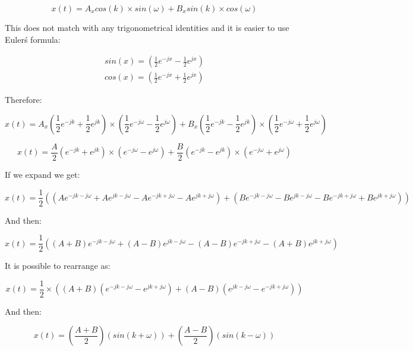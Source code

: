 \begin{equation}
x(t)=A_x cos(k)\times sin(\omega)+ B_x sin(k)\times cos(\omega)
\end{equation}

This does not match with any trigonometrical identities and it is easier to use Euler\'s formula:

\begin{eqnarray}
sin(x)=(\frac{1}{2}e^{-jx} - \frac{1}{2}e^{jx})\\
cos(x)=(\frac{1}{2}e^{-jx} + \frac{1}{2}e^{jx})
\end{eqnarray}

Therefore:

\begin{equation}
x(t)=A_x (\frac{1}{2}e^{-jk} + \frac{1}{2}e^{jk})\times (\frac{1}{2}e^{-j\omega} - \frac{1}{2}e^{j\omega})+ B_x (\frac{1}{2}e^{-jk} - \frac{1}{2}e^{jk})\times (\frac{1}{2}e^{-j\omega} + \frac{1}{2}e^{j\omega})
\end{equation}

\begin{equation}
x(t)=\frac{A}{2} (e^{-jk} + e^{jk})\times (e^{-j\omega} - e^{j\omega})+ \frac{B}{2} (e^{-jk} - e^{jk})\times (e^{-j\omega} + e^{j\omega})
\end{equation}

If we expand we get:

\begin{equation}
x(t)=\frac{1}{2} ((Ae^{-jk-j\omega} + Ae^{jk-j\omega} - Ae^{-jk+j\omega} - Ae^{jk+j\omega}) + (Be^{-jk-j\omega} - Be^{jk-j\omega} - Be^{-jk+j\omega} + Be^{jk+j\omega}))
\end{equation}


And then:

\begin{equation}
x(t)=\frac{1}{2} ((A+B)e^{-jk-j\omega} + (A-B)e^{jk-j\omega} - (A-B)e^{-jk+j\omega} - (A+B)e^{jk+j\omega})
\end{equation}

It is possible to rearrange as:

\begin{equation}
x(t)=\frac{1}{2} \times ((A+B)(e^{-jk-j\omega} - e^{jk+j\omega}) + (A-B)(e^{jk-j\omega} - e^{-jk+j\omega}))
\end{equation}

And then:

\begin{equation}
x(t)=(\frac{A+B}{2} )(sin(k+\omega)) + (\frac{A-B}{2} )(sin(k-\omega))
\end{equation}

